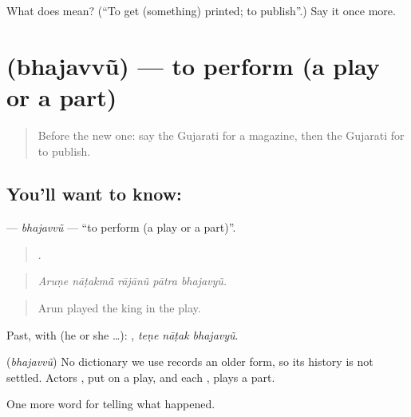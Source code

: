 \begin{tcolorbox}[breakable,colback=teal!4,colframe=teal!35!black,title={Before you move on}]
What does  mean? (\textquotedblleft{}To get (something) printed; to publish\textquotedblright{}.) Say it once more.
\end{tcolorbox}
\section[\texorpdfstring{\gu{ભજવવું} (bhajavvũ)}{ભજવવું (bhajavvũ)}]{ (bhajavvũ) — to perform (a play or a part)}

\label{lesson:GU-C338-bhajavvu}



\begin{quote}
Before the new one: say the Gujarati for a magazine, then the Gujarati for to publish.
\end{quote}

\subsection*{You'll want to know: }
\textbf{} — \emph{bhajavvũ} — \textquotedblleft{}to perform (a play or a part)\textquotedblright{}.

\begin{quote}
    .
\end{quote}

\begin{quote}
\emph{Aruṇe nāṭakmā̃ rājānũ pātra bhajavyũ.}
\end{quote}

\begin{quote}
Arun played the king in the play.
\end{quote}

Past, with  (he or she …):   , \emph{teṇe nāṭak bhajavyũ}.

\begin{cousinweb}
\textbf{} (\emph{bhajavvũ}) No dictionary we use records an older form, so its history is not settled. Actors \textbf{  }, put on a play, and each \textbf{  }, plays a part.
\end{cousinweb}

\begin{grammarlens}[title={What you've built}]
One more word for telling what happened.
\end{grammarlens}

